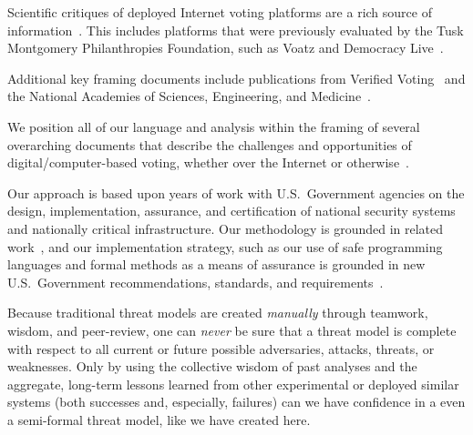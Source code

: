 \documentclass[10pt,letterpaper]{article}
\begin{document}
Scientific critiques of deployed Internet voting platforms are a rich source of information~\cite{KiniryFormallyCountingElectronic2007,KiniryKOARemoteVoting2007,WolchokAttackingWashingtonDC2012,TeagueProblemsiVoteInternet2012,HaldermanNewSouthWales2015a,SpringallSecurityAnalysisEstonian2014}. This includes platforms that were previously evaluated by the Tusk Montgomery Philanthropies Foundation, such as Voatz and Democracy Live~\cite{TrailofBitsVoatzSecurityAssessment2020,TrailofBitsVoatzSecurityAssessment2020a,SpecterEtAlBallotBusted2020,SpecterSecurityAnalysisDemocracy2021}.

Additional key framing documents include publications from Verified Voting~\cite{VerifiedVotingCastingVotesSafely2023,VerifiedVotingInternet} and the National Academies of Sciences, Engineering, and Medicine~\cite{CommitteeontheFutureofVoting:AccessibleReliableVerifiableTechnologySecuringVoteProtecting2018}.

We position all of our language and analysis within the framing of several overarching documents that describe the challenges and opportunities of digital/computer-based voting, whether over the Internet or otherwise~\cite{Dzieduszycka-SuinatFutureVotingEndtoEnd2015a,U.S.ElectionAssistanceCommissionVoluntaryVoting2021}.

Our approach is based upon years of work with U.S.~Government agencies on the design, implementation, assurance, and certification of national security systems and nationally critical infrastructure. Our methodology is grounded in related work~\cite{PeterLoscoccoAssumptionDrivenDesignStrategy}, and our implementation strategy, such as our use of safe programming languages and formal methods as a means of assurance is grounded in new U.S.~Government recommendations, standards, and requirements~\cite{OfficeoftheNationalCyberDirector:TheWhiteHouseBackBuilding2024,UnitedStatesCybersecurityandInfrastructureSecurityAgencyEtAlCaseMemory2023,DefenseScienceBoardTaskForceUndersecretaryofDefenseforResearchandEngineeringFutureCyberWarfighting2024,DefenseScienceBoardTaskForceUndersecretaryofDefenseforResearchandEngineeringSecureElectronicProcessing2025,DefenseScienceBoardTaskForceUndersecretaryofDefenseforResearchandEngineeringTestEvaluationTE2024,TheWhiteHouseSummary2023Request2024,CybersecurityandInfrastructureSecurityAgencyCISAEtAlShiftingBalance}.

Because traditional threat models are created \emph{manually} through teamwork, wisdom, and peer-review, one can \emph{never} be sure that a threat model is complete with respect to all current or future possible adversaries, attacks, threats, or weaknesses. Only by using the collective wisdom of past analyses and the aggregate, long-term lessons learned from other experimental or deployed similar systems (both successes and, especially, failures) can we have confidence in a even a semi-formal threat model, like we have created here.
\end{document}
